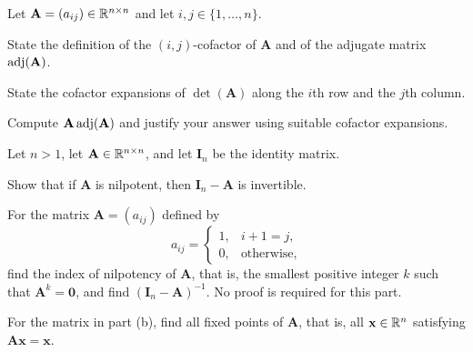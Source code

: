 \begin{problem}
Let $\mathbf A=(a_{ij})\in\mathbb{R}^{n\times n}$ and let $i,j\in\{1,\dots,n\}$.
\begin{problemsubparts}
\item State the definition of the $(i,j)$-cofactor of $\mathbf A$ and of the adjugate matrix $\operatorname{adj}(\mathbf A)$.
\item State the cofactor expansions of $\det(\mathbf A)$ along the $i$th row and the $j$th column.
\item Compute $\mathbf A\operatorname{adj}(\mathbf A)$ and justify your answer using suitable cofactor expansions.
\end{problemsubparts}
\end{problem}

\begin{problem}
Let $n>1$, let $\mathbf A\in\mathbb{R}^{n\times n}$, and let $\mathbf I_n$ be the identity matrix.
\begin{problemsubparts}
\item Show that if $\mathbf A$ is nilpotent, then $\mathbf I_n-\mathbf A$ is invertible.
\item For the matrix $\mathbf A=(a_{ij})$ defined by
\[
a_{ij}=
\begin{cases}
1,&i+1=j,\\
0,&\text{otherwise},
\end{cases}
\]
find the index of nilpotency of $\mathbf A$, that is, the smallest positive integer $k$ such that $\mathbf A^k=\mathbf0$, and find $(\mathbf I_n-\mathbf A)^{-1}$. No proof is required for this part.
\item For the matrix in part \textup{(b)}, find all fixed points of $\mathbf A$, that is, all $\mathbf x\in\mathbb{R}^n$ satisfying $\mathbf A\mathbf x=\mathbf x$.
\end{problemsubparts}
\end{problem}


